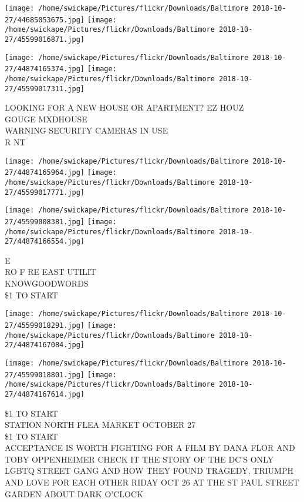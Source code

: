 \documentclass[10pt,letterpaper]{article}
\begin{document}
\texttt{[image: /home/swickape/Pictures/flickr/Downloads/Baltimore 2018-10-27/44685053675.jpg]}
\texttt{[image: /home/swickape/Pictures/flickr/Downloads/Baltimore 2018-10-27/45599016871.jpg]}

\texttt{[image: /home/swickape/Pictures/flickr/Downloads/Baltimore 2018-10-27/44874165374.jpg]}
\texttt{[image: /home/swickape/Pictures/flickr/Downloads/Baltimore 2018-10-27/45599017311.jpg]}

LOOKING FOR A NEW HOUSE OR APARTMENT?  EZ HOUZ\\
GOUGE MXDHOUSE\\
WARNING SECURITY CAMERAS IN USE\\
R NT\\
\pagebreak

\texttt{[image: /home/swickape/Pictures/flickr/Downloads/Baltimore 2018-10-27/44874165964.jpg]}
\texttt{[image: /home/swickape/Pictures/flickr/Downloads/Baltimore 2018-10-27/45599017771.jpg]}

\texttt{[image: /home/swickape/Pictures/flickr/Downloads/Baltimore 2018-10-27/45599008381.jpg]}
\texttt{[image: /home/swickape/Pictures/flickr/Downloads/Baltimore 2018-10-27/44874166554.jpg]}

E\\
RO F RE EAST UTILIT\\
KNOWGOODWORDS\\
\$1 TO START\\
\pagebreak

\texttt{[image: /home/swickape/Pictures/flickr/Downloads/Baltimore 2018-10-27/45599018291.jpg]}
\texttt{[image: /home/swickape/Pictures/flickr/Downloads/Baltimore 2018-10-27/44874167084.jpg]}

\texttt{[image: /home/swickape/Pictures/flickr/Downloads/Baltimore 2018-10-27/45599018801.jpg]}
\texttt{[image: /home/swickape/Pictures/flickr/Downloads/Baltimore 2018-10-27/44874167614.jpg]}

\$1 TO START\\
STATION NORTH FLEA MARKET OCTOBER 27\\
\$1 TO START\\
ACCEPTANCE IS WORTH FIGHTING FOR A FILM BY DANA FLOR AND TOBY OPPENHEIMER CHECK IT THE STORY OF THE DC'S ONLY LGBTQ STREET GANG AND HOW THEY FOUND TRAGEDY, TRIUMPH AND LOVE FOR EACH OTHER RIDAY OCT 26 AT THE ST PAUL STREET GARDEN ABOUT DARK O'CLOCK\\
\pagebreak
\end{document}
